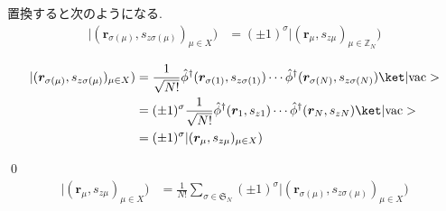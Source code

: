 \documentclass[uplatex,dvipdfmx,a4paper,11pt]{jlreq}
\makeatletter
\newcommand{\ZZ}{\mathbb{Z}}
\renewcommand{\SS}{\mathfrak{S}}
\newcommand{\rr}{\bm{r}}
\numberwithin{equation}{section}
\theoremstyle{definition}
\renewenvironment{proof}[1][\proofname]{\par
  \normalfont
  \topsep6\p@\@plus6\p@ \trivlist
  \item[\hskip\labelsep{\bfseries #1}\@addpunct{\bfseries}]\ignorespaces\quad\par
}{
  \qed\endtrivlist\@endpefalse
}
\renewcommand\proofname{証明}
\makeatother
\begin{document}
\begin{theorem}[Q21-86(i)]
  置換すると次のようになる.
  \begin{align}
    |(\rr_{\sigma(\mu)}, s_{z\sigma(\mu)})_{\mu\in X}) & = (\pm 1)^\sigma|(\rr_{\mu}, s_{z\mu})_{\mu\in\ZZ_N})
  \end{align}
\end{theorem}
\begin{proof}
  \begin{align}
    |(\rr_{\sigma(\mu)}, s_{z\sigma(\mu)})_{\mu\in X}) & = \frac{1}{\sqrt{N!}}\hat{\phi}^\dagger(\rr_{\sigma(1)}, s_{z\sigma(1)})\cdots\hat{\phi}^\dagger(\rr_{\sigma(N)}, s_{z\sigma(N)})\ket|\mathrm{vac}> \\
                                                       & = (\pm 1)^\sigma\frac{1}{\sqrt{N!}}\hat{\phi}^\dagger(\rr_1, s_{z1})\cdots\hat{\phi}^\dagger(\rr_N, s_{zN})\ket|\mathrm{vac}>                       \\
                                                       & = (\pm 1)^\sigma|(\rr_{\mu}, s_{z\mu})_{\mu\in X})
  \end{align}
\end{proof}
\begin{align}
  |(\rr_{\mu}, s_{z\mu})_{\mu\in X}) & = \frac{1}{N!}\sum_{\sigma\in\SS_N}(\pm 1)^\sigma|(\rr_{\sigma(\mu)}, s_{z\sigma(\mu)})_{\mu\in X})
\end{align}
\end{document}
